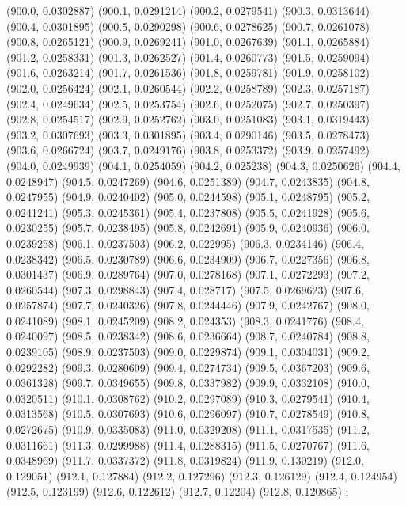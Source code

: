 {					(900.0, 0.0302887)
					(900.1, 0.0291214)
					(900.2, 0.0279541)
					(900.3, 0.0313644)
					(900.4, 0.0301895)
					(900.5, 0.0290298)
					(900.6, 0.0278625)
					(900.7, 0.0261078)
					(900.8, 0.0265121)
					(900.9, 0.0269241)
					(901.0, 0.0267639)
					(901.1, 0.0265884)
					(901.2, 0.0258331)
					(901.3, 0.0262527)
					(901.4, 0.0260773)
					(901.5, 0.0259094)
					(901.6, 0.0263214)
					(901.7, 0.0261536)
					(901.8, 0.0259781)
					(901.9, 0.0258102)
					(902.0, 0.0256424)
					(902.1, 0.0260544)
					(902.2, 0.0258789)
					(902.3, 0.0257187)
					(902.4, 0.0249634)
					(902.5, 0.0253754)
					(902.6, 0.0252075)
					(902.7, 0.0250397)
					(902.8, 0.0254517)
					(902.9, 0.0252762)
					(903.0, 0.0251083)
					(903.1, 0.0319443)
					(903.2, 0.0307693)
					(903.3, 0.0301895)
					(903.4, 0.0290146)
					(903.5, 0.0278473)
					(903.6, 0.0266724)
					(903.7, 0.0249176)
					(903.8, 0.0253372)
					(903.9, 0.0257492)
					(904.0, 0.0249939)
					(904.1, 0.0254059)
					(904.2, 0.025238)
					(904.3, 0.0250626)
					(904.4, 0.0248947)
					(904.5, 0.0247269)
					(904.6, 0.0251389)
					(904.7, 0.0243835)
					(904.8, 0.0247955)
					(904.9, 0.0240402)
					(905.0, 0.0244598)
					(905.1, 0.0248795)
					(905.2, 0.0241241)
					(905.3, 0.0245361)
					(905.4, 0.0237808)
					(905.5, 0.0241928)
					(905.6, 0.0230255)
					(905.7, 0.0238495)
					(905.8, 0.0242691)
					(905.9, 0.0240936)
					(906.0, 0.0239258)
					(906.1, 0.0237503)
					(906.2, 0.022995)
					(906.3, 0.0234146)
					(906.4, 0.0238342)
					(906.5, 0.0230789)
					(906.6, 0.0234909)
					(906.7, 0.0227356)
					(906.8, 0.0301437)
					(906.9, 0.0289764)
					(907.0, 0.0278168)
					(907.1, 0.0272293)
					(907.2, 0.0260544)
					(907.3, 0.0298843)
					(907.4, 0.028717)
					(907.5, 0.0269623)
					(907.6, 0.0257874)
					(907.7, 0.0240326)
					(907.8, 0.0244446)
					(907.9, 0.0242767)
					(908.0, 0.0241089)
					(908.1, 0.0245209)
					(908.2, 0.024353)
					(908.3, 0.0241776)
					(908.4, 0.0240097)
					(908.5, 0.0238342)
					(908.6, 0.0236664)
					(908.7, 0.0240784)
					(908.8, 0.0239105)
					(908.9, 0.0237503)
					(909.0, 0.0229874)
					(909.1, 0.0304031)
					(909.2, 0.0292282)
					(909.3, 0.0280609)
					(909.4, 0.0274734)
					(909.5, 0.0367203)
					(909.6, 0.0361328)
					(909.7, 0.0349655)
					(909.8, 0.0337982)
					(909.9, 0.0332108)
					(910.0, 0.0320511)
					(910.1, 0.0308762)
					(910.2, 0.0297089)
					(910.3, 0.0279541)
					(910.4, 0.0313568)
					(910.5, 0.0307693)
					(910.6, 0.0296097)
					(910.7, 0.0278549)
					(910.8, 0.0272675)
					(910.9, 0.0335083)
					(911.0, 0.0329208)
					(911.1, 0.0317535)
					(911.2, 0.0311661)
					(911.3, 0.0299988)
					(911.4, 0.0288315)
					(911.5, 0.0270767)
					(911.6, 0.0348969)
					(911.7, 0.0337372)
					(911.8, 0.0319824)
					(911.9, 0.130219)
					(912.0, 0.129051)
					(912.1, 0.127884)
					(912.2, 0.127296)
					(912.3, 0.126129)
					(912.4, 0.124954)
					(912.5, 0.123199)
					(912.6, 0.122612)
					(912.7, 0.12204)
					(912.8, 0.120865)
				};
